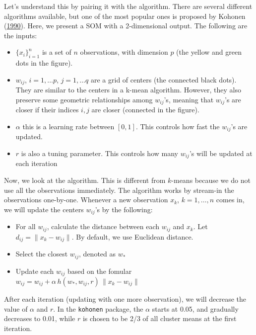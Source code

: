 \documentclass[
]{book}
\providecommand{\tightlist}{%
  \setlength{\itemsep}{0pt}\setlength{\parskip}{0pt}}
\theoremstyle{definition}
\theoremstyle{definition}
\theoremstyle{definition}
\theoremstyle{definition}
\theoremstyle{remark}
\begin{document}
Let's understand this by pairing it with the algorithm. There are several different algorithms available, but one of the most popular ones is proposed by Kohonen (\protect\hyperlink{ref-kohonen1990self}{1990}). Here, we present a SOM with a 2-dimensional output. The following are the inputs:

\begin{itemize}
\tightlist
\item
  \(\{x_i\}_{i=1}^n\) is a set of \(n\) observations, with dimension \(p\) (the yellow and green dots in the figure).
\item
  \(w_{ij}\), \(i = 1, \ldots p\), \(j = 1, \ldots q\) are a grid of centers (the connected black dots). They are similar to the centers in a k-mean algorithm. However, they also preserve some geometric relationships among \(w_{ij}\)'s, meaning that \(w_{ij}\)'s are closer if their indices \({i, j}\) are closer (connected in the figure).
\item
  \(\alpha\) this is a learning rate between \([0, 1]\). This controls how fast the \(w_{ij}\)'s are updated.
\item
  \(r\) is also a tuning parameter. This controls how many \(w_{ij}\)'s will be updated at each iteration
\end{itemize}

Now, we look at the algorithm. This is different from \(k\)-means because we do not use all the observations immediately. The algorithm works by stream-in the observations one-by-one. Whenever a new observation \(x_k\), \(k = 1, \ldots, n\) comes in, we will update the centers \(w_{ij}\)'s by the following:

\begin{itemize}
\tightlist
\item
  For all \(w_{ij}\), calculate the distance between each \(w_{ij}\) and \(x_k\). Let \(d_{ij} = \lVert x_k - w_{ij} \rVert\). By default, we use Euclidean distance.
\item
  Select the closest \(w_{ij}\), denoted as \(w_{\ast}\)
\item
  Update each \(w_{ij}\) based on the fomular \(w_{ij} = w_{ij} + \alpha \, h(w_\ast, w_{ij}, r) \, \lVert x_k - w_{ij} \rVert\)
\end{itemize}

After each iteration (updating with one more observation), we will decrease the value of \(\alpha\) and \(r\). In the \texttt{kohonen} package, the \(\alpha\) starts at 0.05, and gradually decreases to 0.01, while \(r\) is chosen to be 2/3 of all cluster means at the first iteration.
\end{document}
